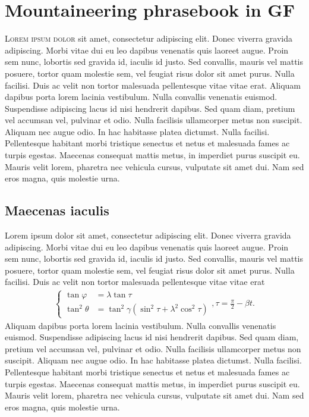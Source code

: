 \chapter{Mountaineering phrasebook in GF}
\lettrine[lines=4, loversize=-0.1, lraise=0.1]{L}{orem ipsum dolor} sit amet, consectetur adipiscing elit. Donec viverra gravida adipiscing. Morbi vitae dui eu leo dapibus venenatis quis laoreet augue. Proin sem nunc, lobortis sed gravida id, iaculis id justo. Sed convallis, mauris vel mattis posuere, tortor quam molestie sem, vel feugiat risus dolor sit amet purus. Nulla facilisi. Duis ac velit non tortor malesuada pellentesque vitae vitae erat. Aliquam dapibus porta lorem lacinia vestibulum. Nulla convallis venenatis euismod. Suspendisse adipiscing lacus id nisi hendrerit dapibus. Sed quam diam, pretium vel accumsan vel, pulvinar et odio. Nulla facilisis ullamcorper metus non suscipit. Aliquam nec augue odio. In hac habitasse platea dictumst. Nulla facilisi. Pellentesque habitant morbi tristique senectus et netus et malesuada fames ac turpis egestas. Maecenas consequat mattis metus, in imperdiet purus suscipit eu. Mauris velit lorem, pharetra nec vehicula cursus, vulputate sit amet dui. Nam sed eros magna, quis molestie urna.
\section{Maecenas iaculis}
Lorem ipsum dolor sit amet, consectetur adipiscing elit. Donec viverra gravida adipiscing. Morbi vitae dui eu leo dapibus venenatis quis laoreet augue. Proin sem nunc, lobortis sed gravida id, iaculis id justo. Sed convallis, mauris vel mattis posuere, tortor quam molestie sem, vel feugiat risus dolor sit amet purus. Nulla facilisi. Duis ac velit non tortor malesuada pellentesque vitae vitae erat
\begin{gather*}
\left\{\begin{split}
\tan \varphi &= \lambda \tan \tau \\
\tan^2 \theta &= \tan^2 \gamma (\sin^2\tau + \lambda^2 \cos^2\tau)
\end{split}\right., \tau = \frac{\pi}{2}-\beta t.
\end{gather*}
Aliquam dapibus porta lorem lacinia vestibulum. Nulla convallis venenatis euismod. Suspendisse adipiscing lacus id nisi hendrerit dapibus. Sed quam diam, pretium vel accumsan vel, pulvinar et odio. Nulla facilisis ullamcorper metus non suscipit. Aliquam nec augue odio. In hac habitasse platea dictumst. Nulla facilisi. Pellentesque habitant morbi tristique senectus et netus et malesuada fames ac turpis egestas. Maecenas consequat mattis metus, in imperdiet purus suscipit eu. Mauris velit lorem, pharetra nec vehicula cursus, vulputate sit amet dui. Nam sed eros magna, quis molestie urna.

